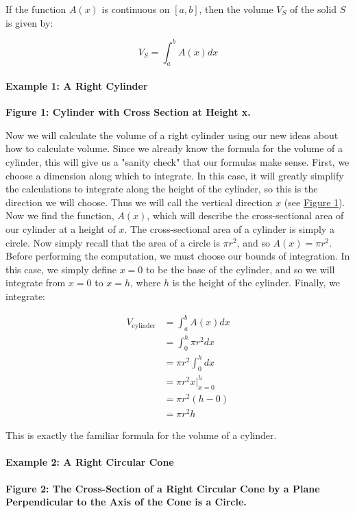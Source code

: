 If the function $A(x)$ is continuous on $[a,b]$, then the volume $V_S$ of the solid $S$ is given by:

$$V_S = \int_a^b A(x) dx$$

\paragraph{Example 1: A Right Cylinder}

\textbf{Figure 1: Cylinder with Cross Section at Height x.}

Now we will calculate the volume of a right cylinder using our new ideas about how to calculate volume. Since we already know the formula for the volume of a cylinder, this will give us a "sanity check" that our formulas make sense. First, we choose a dimension along which to integrate. In this case, it will greatly simplify the calculations to integrate along the height of the cylinder, so this is the direction we will choose. Thus we will call the vertical direction $x$ (see \href{Cylinder_with_cross_section_at_height_x.svg}{Figure 1}). Now we find the function, $A(x)$, which will describe the cross-sectional area of our cylinder at a height of $x$. The cross-sectional area of a cylinder is simply a circle. Now simply recall that the area of a circle is $\pi r^2$, and so $A(x) = \pi r^2$. Before performing the computation, we must choose our bounds of integration. In this case, we simply define $x=0$ to be the base of the cylinder, and so we will integrate from $x=0$ to $x=h$, where $h$ is the height of the cylinder. Finally, we integrate:

\begin{align}
V_{\mathrm{cylinder}} &= \int_a^b A(x) dx\\
&= \int_0^h \pi r^2 dx\\
&= \pi r^2 \int_0^h dx\\
&= \pi r^2 x \bigg|_{x=0}^h\\
&= \pi r^2 (h-0)\\
&= \pi r^2 h
\end{align}

This is exactly the familiar formula for the volume of a cylinder.

\paragraph{Example 2: A Right Circular Cone}

\textbf{Figure 2: The Cross-Section of a Right Circular Cone by a Plane Perpendicular to the Axis of the Cone is a Circle.}

